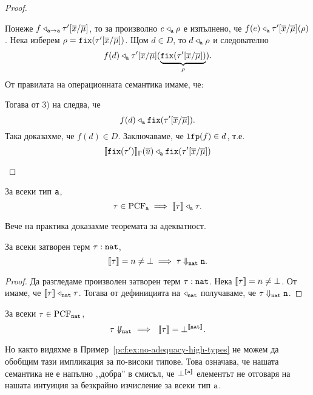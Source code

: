 \begin{proof}
\begin{itemize}
    Понеже $f \triangleleft_{\vv{a}\to\vv{a}} \tau'[\ov{x}/\ov{\mu}]$, то
    за произволно $e \triangleleft_{\vv{a}} \rho$ е изпълнено, че
    $f(e) \triangleleft_{\vv{a}} \tau'[\ov{x}/\ov{\mu}](\rho)$.
    Нека изберем $\rho = \fix(\tau'[\ov{x}/\ov{\mu}])$. Щом $d \in D$, то $d \triangleleft_{\vv{a}} \rho$ и следователно
    \[f(d) \triangleleft_{\vv{a}} \tau'[\ov{x}/\ov{\mu}](\underbrace{\fix(\tau'[\ov{x}/\ov{\mu}])}_{\rho}).\]
    От правилата на операционната семантика имаме, че:
    \begin{prooftree}
    \end{prooftree}
    Тогава от 3) на  следва, че
    \[f(d) \triangleleft_{\vv{a}} \fix(\tau'[\ov{x}/\ov{\mu}]).\]
    Така доказахме, че $f(d) \in D$.
    Заключаваме, че $\lfp(f) \in d$, т.е.
    \[\val{\fix(\tau')}_\Gamma(\ov{u}) \triangleleft_{\vv{a}} \fix(\tau'[\ov{x}/\ov{\mu}])\]
  \end{itemize}
\end{proof}

\begin{corollary}\label{cr:pcf:fundamental}
  За всеки тип $\vv{a}$,
  \[\tau \in \text{PCF}_{\vv{a}} \implies \val{\tau} \triangleleft_{\vv{a}} \tau.\]
\end{corollary}

Вече на практика доказахме теоремата за адекватност.

\begin{framed}
  \begin{theorem}\label{th:pcf:adequacy}
    За всеки затворен терм $\tau : \vv{nat}$, 
    \[\val{\tau} = n \neq \bot \implies \tau \Downarrow_{\vv{nat}} \vv{n}.\]
  \end{theorem}
\end{framed}
\begin{proof}
  Да разгледаме произволен затворен терм $\tau : \vv{nat}$.
  Нека $\val{\tau} = n \neq \bot$.
  От  имаме, че $\val{\tau} \triangleleft_{\vv{nat}} \tau$.
  Тогава от дефиницията на $\triangleleft_{\vv{nat}}$ получаваме, че $\tau \Downarrow_{\vv{nat}} \vv{n}$.
\end{proof}

\begin{corollary}
  За всеки $\tau \in \text{PCF}_{\vv{nat}}$,
  \[\tau \not\Downarrow_{\vv{nat}}\ \implies\ \val{\tau} = \bot^{\val{\vv{nat}}}.\]  
\end{corollary}


Но както видяхме в Пример~\ref{pcf:ex:no-adequacy-high-types} не можем да обобщим тази импликация за по-високи типове.
Това означава, че нашата семантика не е напълно ,,добра'' в смисъл, че $\bot^{\val{\vv{a}}}$ елементът не
отговаря на нашата интуиция за безкрайно изчисление за всеки тип $\vv{a}$.



